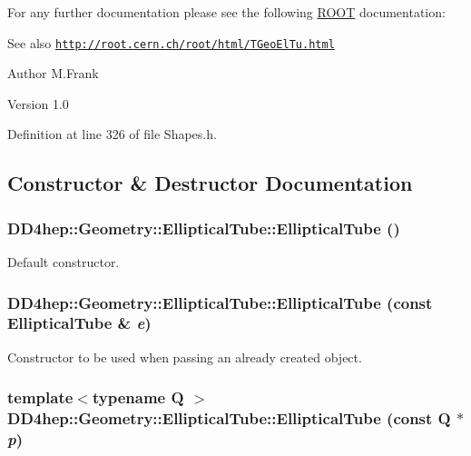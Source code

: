 For any further documentation please see the following \hyperlink{namespace_r_o_o_t}{ROOT} documentation: \begin{DoxySeeAlso}{See also}
\href{http://root.cern.ch/root/html/TGeoElTu.html}{\tt http://root.cern.ch/root/html/TGeoElTu.html}
\end{DoxySeeAlso}
\begin{DoxyAuthor}{Author}
M.Frank 
\end{DoxyAuthor}
\begin{DoxyVersion}{Version}
1.0 
\end{DoxyVersion}


Definition at line 326 of file Shapes.h.

\subsection{Constructor \& Destructor Documentation}
\hypertarget{class_d_d4hep_1_1_geometry_1_1_elliptical_tube_a0a8ef871e88153ec8d4300db25e31a66}{
\subsubsection[{EllipticalTube}]{\setlength{\rightskip}{0pt plus 5cm}DD4hep::Geometry::EllipticalTube::EllipticalTube ()}}
\label{class_d_d4hep_1_1_geometry_1_1_elliptical_tube_a0a8ef871e88153ec8d4300db25e31a66}


Default constructor. \hypertarget{class_d_d4hep_1_1_geometry_1_1_elliptical_tube_a13ceb98edf7cd632d06fe9e72cc46f29}{
\subsubsection[{EllipticalTube}]{\setlength{\rightskip}{0pt plus 5cm}DD4hep::Geometry::EllipticalTube::EllipticalTube (const {\bf EllipticalTube} \& {\em e})}}
\label{class_d_d4hep_1_1_geometry_1_1_elliptical_tube_a13ceb98edf7cd632d06fe9e72cc46f29}


Constructor to be used when passing an already created object. \hypertarget{class_d_d4hep_1_1_geometry_1_1_elliptical_tube_a5d1ad2dab1eddc355b8cbcac55aff2fa}{
\subsubsection[{EllipticalTube}]{\setlength{\rightskip}{0pt plus 5cm}template$<$typename Q $>$ DD4hep::Geometry::EllipticalTube::EllipticalTube (const Q $\ast$ {\em p})}}
\label{class_d_d4hep_1_1_geometry_1_1_elliptical_tube_a5d1ad2dab1eddc355b8cbcac55aff2fa}


